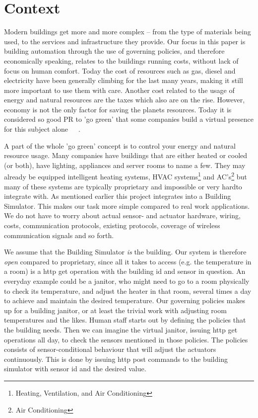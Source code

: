 \section{Context} \label{sec:context}
Modern buildings get more and more complex -- from the type of materials being used, to the services and infrastructure they provide. Our focus in this paper is building automation through the use of governing policies, and therefore economically speaking, relates to the buildings running costs, without lack of focus on human comfort. Today the cost of resources such as gas, diesel and electricity have been generally climbing for the last many years, making it still more important to use them with care. Another cost related to the usage of energy and natural resources are the taxes which also are on the rise. However, economy is not the only factor for saving the planets resources. Today it is considered so good PR to 'go green' that some companies build a virtual presence for this subject alone~\cite{green-google}~\cite{green-facebook}~\cite{green-microsoft}.

A part of the whole 'go green' concept is to control your energy and natural resource usage. Many companies have buildings that are either heated or cooled (or both), have lighting, appliances and server rooms to name a few. They may already be equipped intelligent heating systems, HVAC systems\footnote{Heating, Ventilation, and Air Conditioning} and AC's\footnote{Air Conditioning} but many of these systems are typically proprietary and impossible \textemdash or very hard\textemdash to integrate with. As mentioned earlier this project integrates into a Building Simulator. This makes our task more simple compared to real work applications. We do not have to worry about actual sensor- and actuator hardware, wiring, costs, communication protocols, existing protocols, coverage of wireless communication signals and so forth.

We assume that the Building Simulator \textit{is} the building. Our system is therefore \textit{open} compared to proprietary, since all it takes to access (e.g. the temperature in a room) is a http get operation with the building id and sensor in question. An everyday example could be a janitor, who might need to go to a room physically to check its temperature, and adjust the heater in that room, several times a day to achieve and maintain the desired temperature. Our governing policies makes up for a building janitor, or at least the trivial work with adjusting room temperatures and the likes. Human staff starts out by defining the policies that the building needs. Then we can imagine the virtual janitor, issuing http get operations all day, to check the sensors mentioned in those policies. The policies consists of sensor-conditional behaviour that will adjust the actuators continuously. This is done by issuing http post commands to the building simulator with sensor id and the desired value.


